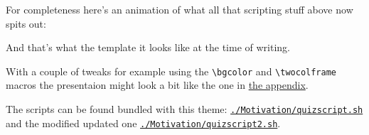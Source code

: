 {
\begin{frame}
\scriptsize
For completeness here's an animation of what all that scripting stuff above now spits out:
\begin{center}
\end{center}
And that's what the template it looks like at the time of writing. 

With a couple of tweaks for example using the {\tt \textbackslash{}bgcolor} and {\tt \textbackslash{}twocolframe} macros the presentaion might look a bit like the one in \hyperlink{Part6}{\color{ScoutPurple}the appendix}.

The scripts can be found bundled with this theme: \href{file:Motivation/quizscript.sh}{\tt ./Motivation/quizscript.sh} and the modified updated one \href{file:Motivation/quizscript2.sh}{\tt ./Motivation/quizscript2.sh}.
\end{frame}
}
